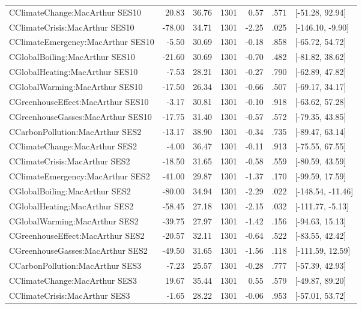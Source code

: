 \begin{table}[ht]
\begin{tabular}{lrrrrrl}
  CClimateChange:MacArthur SES10 & 20.83 & 36.76 & 1301 & 0.57 & .571 & [-51.28, 92.94] \\ 
  CClimateCrisis:MacArthur SES10 & -78.00 & 34.71 & 1301 & -2.25 & .025 & [-146.10, -9.90] \\ 
  CClimateEmergency:MacArthur SES10 & -5.50 & 30.69 & 1301 & -0.18 & .858 & [-65.72, 54.72] \\ 
  CGlobalBoiling:MacArthur SES10 & -21.60 & 30.69 & 1301 & -0.70 & .482 & [-81.82, 38.62] \\ 
  CGlobalHeating:MacArthur SES10 & -7.53 & 28.21 & 1301 & -0.27 & .790 & [-62.89, 47.82] \\ 
  CGlobalWarming:MacArthur SES10 & -17.50 & 26.34 & 1301 & -0.66 & .507 & [-69.17, 34.17] \\ 
  CGreenhouseEffect:MacArthur SES10 & -3.17 & 30.81 & 1301 & -0.10 & .918 & [-63.62, 57.28] \\ 
  CGreenhouseGasses:MacArthur SES10 & -17.75 & 31.40 & 1301 & -0.57 & .572 & [-79.35, 43.85] \\ 
  CCarbonPollution:MacArthur SES2 & -13.17 & 38.90 & 1301 & -0.34 & .735 & [-89.47, 63.14] \\ 
  CClimateChange:MacArthur SES2 & -4.00 & 36.47 & 1301 & -0.11 & .913 & [-75.55, 67.55] \\ 
  CClimateCrisis:MacArthur SES2 & -18.50 & 31.65 & 1301 & -0.58 & .559 & [-80.59, 43.59] \\ 
  CClimateEmergency:MacArthur SES2 & -41.00 & 29.87 & 1301 & -1.37 & .170 & [-99.59, 17.59] \\ 
  CGlobalBoiling:MacArthur SES2 & -80.00 & 34.94 & 1301 & -2.29 & .022 & [-148.54, -11.46] \\ 
  CGlobalHeating:MacArthur SES2 & -58.45 & 27.18 & 1301 & -2.15 & .032 & [-111.77, -5.13] \\ 
  CGlobalWarming:MacArthur SES2 & -39.75 & 27.97 & 1301 & -1.42 & .156 & [-94.63, 15.13] \\ 
  CGreenhouseEffect:MacArthur SES2 & -20.57 & 32.11 & 1301 & -0.64 & .522 & [-83.55, 42.42] \\ 
  CGreenhouseGasses:MacArthur SES2 & -49.50 & 31.65 & 1301 & -1.56 & .118 & [-111.59, 12.59] \\ 
  CCarbonPollution:MacArthur SES3 & -7.23 & 25.57 & 1301 & -0.28 & .777 & [-57.39, 42.93] \\ 
  CClimateChange:MacArthur SES3 & 19.67 & 35.44 & 1301 & 0.55 & .579 & [-49.87, 89.20] \\ 
  CClimateCrisis:MacArthur SES3 & -1.65 & 28.22 & 1301 & -0.06 & .953 & [-57.01, 53.72] \\ 

\end{tabular}
\end{table}
